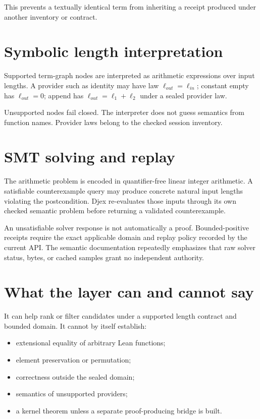 \documentclass[10pt,letterpaper,oneside,openany]{report}
\begin{document}
This prevents a textually identical term from inheriting a receipt produced under another inventory or contract.

\section{Symbolic length interpretation}

Supported term-graph nodes are interpreted as arithmetic expressions over input lengths.  A provider such as identity may have law $\ell_{out}=\ell_{in}$; constant empty has $\ell_{out}=0$; append has $\ell_{out}=\ell_1+\ell_2$ under a sealed provider law.

Unsupported nodes fail closed.  The interpreter does not guess semantics from function names.  Provider laws belong to the checked session inventory.

\section{SMT solving and replay}

The arithmetic problem is encoded in quantifier-free linear integer arithmetic.  A satisfiable counterexample query may produce concrete natural input lengths violating the postcondition.  Djex re-evaluates those inputs through its own checked semantic problem before returning a validated counterexample.

An unsatisfiable solver response is not automatically a proof.  Bounded-positive receipts require the exact applicable domain and replay policy recorded by the current API.  The semantic documentation repeatedly emphasizes that raw solver status, bytes, or cached samples grant no independent authority.

\section{What the layer can and cannot say}

It can help rank or filter candidates under a supported length contract and bounded domain.  It cannot by itself establish:

\begin{itemize}
\item extensional equality of arbitrary Lean functions;
\item element preservation or permutation;
\item correctness outside the sealed domain;
\item semantics of unsupported providers;
\item a kernel theorem unless a separate proof-producing bridge is built.
\end{itemize}
\end{document}
